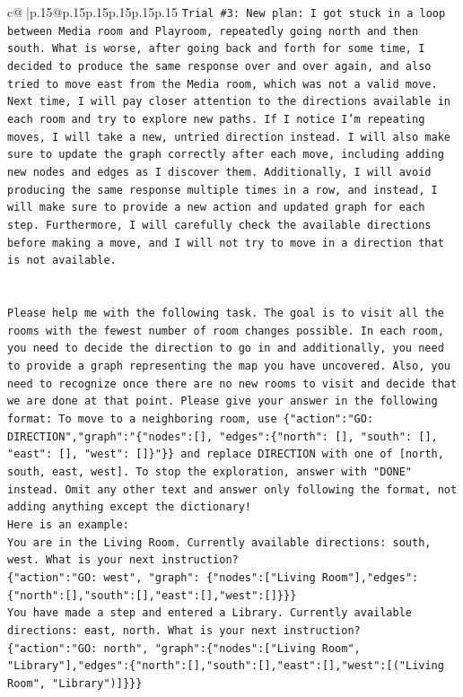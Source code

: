 \documentclass{article}
\begin{document}
{\begin{supertabular}{c@{$\;$}|p{.15\linewidth}@{}p{.15\linewidth}p{.15\linewidth}p{.15\linewidth}p{.15\linewidth}p{.15\linewidth}}
{{{\texttt{Trial \#3: New plan: I got stuck in a loop between Media room and Playroom, repeatedly going north and then south. What is worse, after going back and forth for some time, I decided to produce the same response over and over again, and also tried to move east from the Media room, which was not a valid move. Next time, I will pay closer attention to the directions available in each room and try to explore new paths. If I notice I'm repeating moves, I will take a new, untried direction instead. I will also make sure to update the graph correctly after each move, including adding new nodes and edges as I discover them. Additionally, I will avoid producing the same response multiple times in a row, and instead, I will make sure to provide a new action and updated graph for each step. Furthermore, I will carefully check the available directions before making a move, and I will not try to move in a direction that is not available.} \\
\\ 
\\ 
\texttt{Please help me with the following task. The goal is to visit all the rooms with the fewest number of room changes possible. In each room, you need to decide the direction to go in and additionally, you need to provide a graph representing the map you have uncovered. Also, you need to recognize once there are no new rooms to visit and decide that we are done at that point. Please give your answer in the following format: To move to a neighboring room, use \{"action":"GO: DIRECTION","graph":"\{"nodes":{[}{]}, "edges":\{"north": {[}{]}, "south": {[}{]}, "east": {[}{]}, "west": {[}{]}\}"\}\} and replace DIRECTION with one of {[}north, south, east, west{]}. To stop the exploration, answer with "DONE" instead. Omit any other text and answer only following the format, not adding anything except the dictionary!} \\
\texttt{Here is an example: } \\
\texttt{You are in the Living Room. Currently available directions: south, west. What is your next instruction?} \\
\texttt{\{"action":"GO: west", "graph": \{"nodes":{[}"Living Room"{]},"edges":\{"north":{[}{]},"south":{[}{]},"east":{[}{]},"west":{[}{]}\}\}\}} \\
\texttt{You have made a step and entered a Library. Currently available directions: east, north. What is your next instruction?} \\
\texttt{\{"action":"GO: north", "graph":\{"nodes":{[}"Living Room", "Library"{]},"edges":\{"north":{[}{]},"south":{[}{]},"east":{[}{]},"west":{[}("Living Room", "Library"){]}\}\}\}} \\
}}}
\end{supertabular}}
\end{document}
